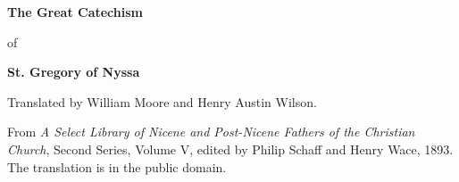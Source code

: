 \documentclass[11pt,letterpaper]{article}
\begin{document}
\color{ink}

\begin{titlepage}
\centering
\vspace*{4em}
{\LARGE\bfseries\color{heading} The Great Catechism\par}
\vspace{1em}
{\large of\par}
\vspace{1em}
{\LARGE\bfseries\color{heading} St. Gregory of Nyssa\par}
\vspace{3em}
{Translated by William Moore and Henry Austin Wilson.\par}
\vfill
{\small From \emph{A Select Library of Nicene and Post-Nicene Fathers of the
Christian Church}, Second Series, Volume V, edited by Philip Schaff and
Henry Wace, 1893. The translation is in the public domain.\par}
\vspace{2em}
\end{titlepage}

\tableofcontents
\clearpage


\end{document}
